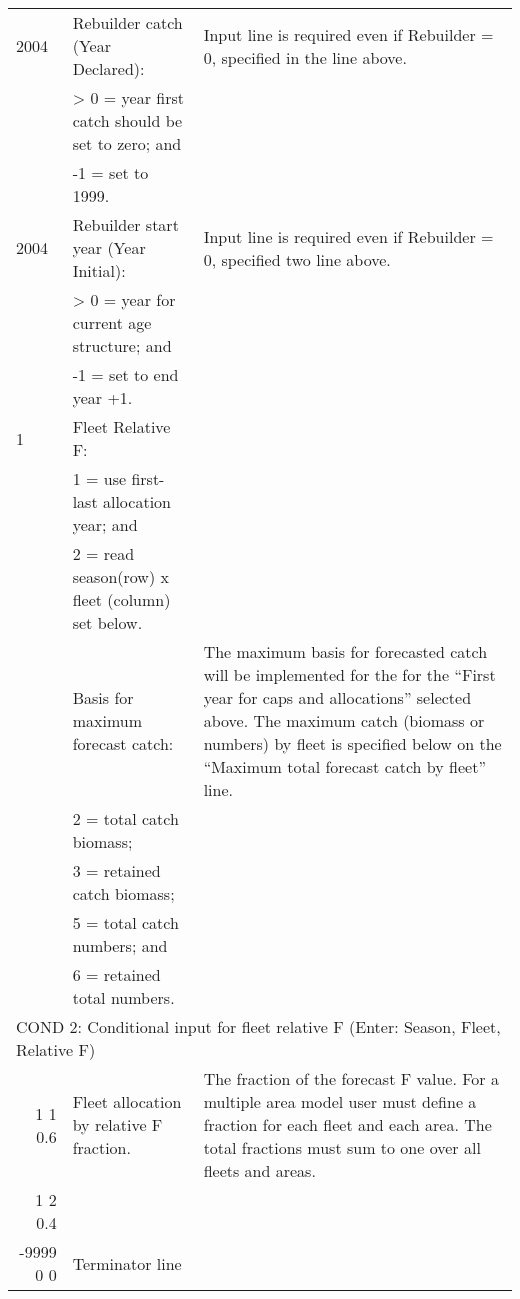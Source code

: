 \begin{landscape}
{\begin{longtable}{p{2cm} p{7cm} p{12cm}}
  \hline
  2004 & Rebuilder catch (Year Declared): & \multirow{1}{1cm}[-0.2cm]{\parbox{12cm}{Input line is required even if Rebuilder = 0, specified in the line above.}} \Tstrut\\
    & > 0 = year first catch should be set to zero; and & \\
    & -1 = set to 1999. & \Bstrut\\

  \hline
  2004 & Rebuilder start year (Year Initial): & \multirow{1}{1cm}[-0.2cm]{\parbox{12cm}{Input line is required even if Rebuilder = 0, specified two line above.}} \Tstrut\\
    & > 0 = year for current age structure; and & \\
    & -1 = set to end year +1. & \Bstrut\\

  \hline
  1 & Fleet Relative F: & \Tstrut\\
    & 1 = use first-last allocation year; and & \\
    & 2 = read season(row) x fleet (column) set below. & \Bstrut\\

  \pagebreak
  2 & Basis for maximum forecast catch: & \multirow{1}{1cm}[-0.25cm]{\parbox{12cm}{The maximum basis for forecasted catch will be implemented for the for the ``First year for caps and allocations'' selected above. The maximum catch (biomass or numbers) by fleet is specified below on the ``Maximum total forecast catch by fleet'' line.}} \Tstrut\\
    & 2 = total catch biomass; & \\
    & 3 = retained catch biomass; & \\
    & 5 = total catch numbers; and & \\
    & 6 = retained total numbers. & \Bstrut\\

  \hline 
  \multicolumn{3}{l}{COND 2: Conditional input for fleet relative F (Enter: Season, Fleet, Relative F)} \Tstrut\\
  \multicolumn{1}{r}{1 1 0.6} & Fleet allocation by relative F fraction. & \multirow{1}{1cm}[-0.25cm]{\parbox{12cm}{The fraction of the forecast F value. For a multiple area model user must define a fraction for each fleet and each area. The total fractions must sum to one over all fleets and areas.}} \\
  \multicolumn{1}{r}{1 2 0.4} & & \\
  \multicolumn{1}{r}{-9999 0 0} & Terminator line & \Bstrut\\ 


\end{longtable}}
\end{landscape}
